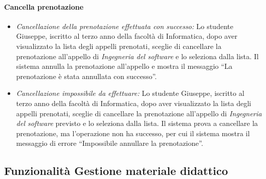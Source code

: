 \paragraph{Cancella prenotazione}
\begin{itemize}
	\item \textit{Cancellazione della prenotazione effettuata con successo:}
	Lo studente Giuseppe, iscritto al terzo anno della facoltà di Informatica, dopo aver visualizzato la lista degli appelli prenotati, sceglie di cancellare la prenotazione all’appello di \textit{Ingegneria del software} e lo seleziona dalla lista. Il sistema annulla la prenotazione all’appello e mostra il messaggio “La prenotazione è stata annullata con successo”.
	
	\item \textit{Cancellazione impossibile da effettuare:}
	Lo studente Giuseppe, iscritto al terzo anno della facoltà di Informatica, dopo aver visualizzato la lista degli appelli prenotati, sceglie di cancellare la prenotazione all’appello di \textit{Ingegneria del software} previsto e lo seleziona dalla lista. Il sistema prova a cancellare la prenotazione, ma l’operazione non ha successo, per cui il sistema mostra il messaggio di errore “Impossibile annullare la prenotazione”.
\end{itemize}

\subsection{Funzionalità Gestione materiale didattico}
